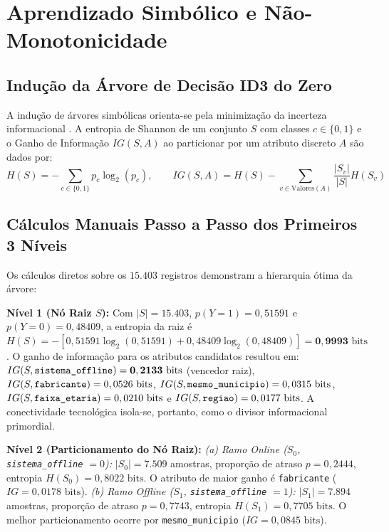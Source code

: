 \documentclass[12pt]{article}
\begin{document}
\section{Aprendizado Simbólico e Não-Monotonicidade}

\subsection{Indução da Árvore de Decisão ID3 do Zero}

A indução de árvores simbólicas orienta-se pela minimização da incerteza informacional \cite{quinlan1986,mitchell1997}. A entropia de Shannon de um conjunto $S$ com classes $c \in \{0, 1\}$ e o Ganho de Informação $IG(S, A)$ ao particionar por um atributo discreto $A$ são dados por:
\begin{equation}
H(S) = - \sum_{c \in \{0, 1\}} p_c \log_2(p_c), \qquad IG(S, A) = H(S) - \sum_{v \in \text{Valores}(A)} \frac{|S_v|}{|S|} H(S_v)
\end{equation}

\subsection{Cálculos Manuais Passo a Passo dos Primeiros 3 Níveis}

Os cálculos diretos sobre os $15.403$ registros demonstram a hierarquia ótima da árvore:

\textbf{Nível 1 (Nó Raiz $S$):} Com $|S| = 15.403$, $p(Y=1) = 0,51591$ e $p(Y=0) = 0,48409$, a entropia da raiz é $H(S) = - [0,51591 \log_2(0,51591) + 0,48409 \log_2(0,48409)] = \mathbf{0,9993} \text{ bits}$. O ganho de informação para os atributos candidatos resultou em:
$IG(S, \text{\texttt{sistema\_offline}}) = \mathbf{0,2133} \text{ bits}$ (vencedor raiz),
$IG(S, \text{\texttt{fabricante}}) = 0,0526 \text{ bits}$,
$IG(S, \text{\texttt{mesmo\_municipio}}) = 0,0315 \text{ bits}$,
$IG(S, \text{\texttt{faixa\_etaria}}) = 0,0210 \text{ bits}$ e
$IG(S, \text{\texttt{regiao}}) = 0,0177 \text{ bits}$.
A conectividade tecnológica isola-se, portanto, como o divisor informacional primordial.

\textbf{Nível 2 (Particionamento do Nó Raiz):}
\textit{(a) Ramo Online ($S_0$, \texttt{sistema\_offline} $= 0$):} $|S_0| = 7.509$ amostras, proporção de atraso $p=0,2444$, entropia $H(S_0) = 0,8022 \text{ bits}$. O atributo de maior ganho é \texttt{fabricante} ($IG = 0,0178 \text{ bits}$).
\textit{(b) Ramo Offline ($S_1$, \texttt{sistema\_offline} $= 1$):} $|S_1| = 7.894$ amostras, proporção de atraso $p=0,7743$, entropia $H(S_1) = 0,7705 \text{ bits}$. O melhor particionamento ocorre por \texttt{mesmo\_municipio} ($IG = 0,0845 \text{ bits}$).
\end{document}
